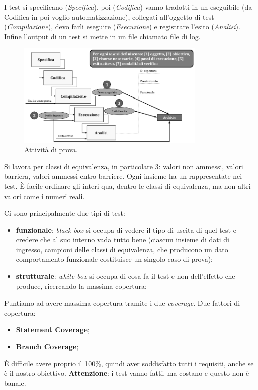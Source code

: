 		I test si specificano (\textit{Specifica}), poi (\textit{Codifica}) vanno tradotti in un eseguibile (da Codifica in poi voglio automatizzazione), collegati all'oggetto di test (\textit{Compilazione}), devo farli eseguire (\textit{Esecuzione}) e registrare l'esito (\textit{Analisi}). Infine l'output di un test si mette in un file chiamato file di log.
		
		\begin{figure}[H]
			\centering
			\includegraphics[width=0.8\textwidth]{img/prove}		
			\caption{Attività di prova.}
		\end{figure} 
		
		Si lavora per classi di equivalenza, in particolare 3: valori non ammessi, valori barriera, valori ammessi entro barriere. Ogni insieme ha un rappresentate nei test. È facile ordinare gli interi qua, dentro le classi di equivalenza, ma non altri valori come i numeri reali.
		
		Ci sono principalmente due tipi di test:
		\begin{itemize}
			\item \textbf{funzionale}: \textit{black-box} si occupa di vedere il tipo di uscita di quel test e credere che al suo interno vada tutto bene (ciascun insieme di dati di ingresso, campioni delle classi di equivalenza, che producono un dato comportamento funzionale costituisce un singolo caso di prova);
			\item \textbf{strutturale}: \textit{white-box} si occupa di cosa fa il test e non dell'effetto che produce, ricercando la massima copertura;
		\end{itemize}	
		Puntiamo ad avere massima copertura tramite i due \textit{coverage}.
		Due fattori di copertura: %
		\begin{itemize}
			\item \textbf{\underline{\hyperref[statementcoverage]{Statement Coverage}}};
			\item \textbf{\underline{\hyperref[branchcoverage]{Branch Coverage}}};
		\end{itemize}
		È difficile avere proprio il 100\%, quindi aver soddisfatto tutti i requisiti, anche se è il nostro obiettivo.
		\textbf{Attenzione}: i test vanno fatti, ma costano e questo non è banale.
			
